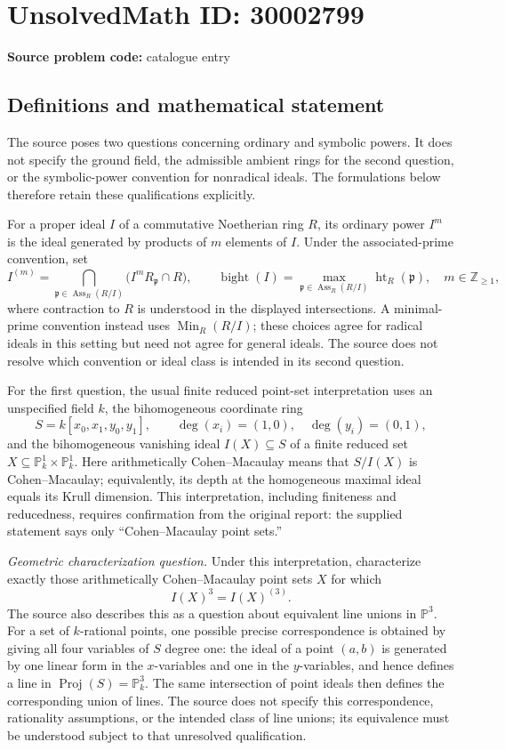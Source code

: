 \documentclass[11pt]{article}
\newcommand{\Z}{\mathbb{Z}}
\newcommand{\PP}{\mathbb{P}}
\begin{document}
\section*{UnsolvedMath ID: 30002799}
\textbf{Source problem code:} catalogue entry
\subsection{Definitions and mathematical statement}
The source poses two questions concerning ordinary and symbolic powers. It does not specify the ground field, the admissible ambient rings for the second question, or the symbolic-power convention for nonradical ideals. The formulations below therefore retain these qualifications explicitly.

For a proper ideal \(I\) of a commutative Noetherian ring \(R\), its ordinary power \(I^m\) is the ideal generated by products of \(m\) elements of \(I\). Under the associated-prime convention, set
\[
 I^{(m)}=\bigcap_{\mathfrak p\in\operatorname{Ass}_R(R/I)}\bigl(I^mR_{\mathfrak p}\cap R\bigr),
 \qquad
 \operatorname{bight}(I)=\max_{\mathfrak p\in\operatorname{Ass}_R(R/I)}\operatorname{ht}_R(\mathfrak p),
 \quad m\in\Z_{\geq1},
\]
where contraction to \(R\) is understood in the displayed intersections. A minimal-prime convention instead uses \(\operatorname{Min}_R(R/I)\); these choices agree for radical ideals in this setting but need not agree for general ideals. The source does not resolve which convention or ideal class is intended in its second question.

For the first question, the usual finite reduced point-set interpretation uses an unspecified field \(k\), the bihomogeneous coordinate ring
\[
 S=k[x_0,x_1,y_0,y_1],\qquad
 \deg(x_i)=(1,0),\quad \deg(y_i)=(0,1),
\]
and the bihomogeneous vanishing ideal \(I(X)\subseteq S\) of a finite reduced set \(X\subseteq\PP^1_k\times\PP^1_k\). Here arithmetically Cohen--Macaulay means that \(S/I(X)\) is Cohen--Macaulay; equivalently, its depth at the homogeneous maximal ideal equals its Krull dimension. This interpretation, including finiteness and reducedness, requires confirmation from the original report: the supplied statement says only ``Cohen--Macaulay point sets.''

\emph{Geometric characterization question.} Under this interpretation, characterize exactly those arithmetically Cohen--Macaulay point sets \(X\) for which
\[
 I(X)^3=I(X)^{(3)}.
\]
The source also describes this as a question about equivalent line unions in \(\PP^3\). For a set of \(k\)-rational points, one possible precise correspondence is obtained by giving all four variables of \(S\) degree one: the ideal of a point \((a,b)\) is generated by one linear form in the \(x\)-variables and one in the \(y\)-variables, and hence defines a line in \(\operatorname{Proj}(S)=\PP^3_k\). The same intersection of point ideals then defines the corresponding union of lines. The source does not specify this correspondence, rationality assumptions, or the intended class of line unions; its equivalence must be understood subject to that unresolved qualification.
\end{document}
